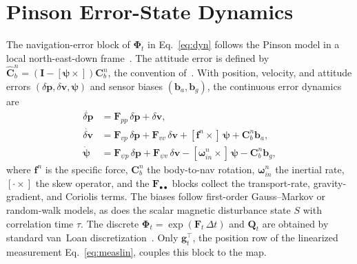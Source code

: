 \documentclass{IEEEtaes}
\begin{document}
\section{Pinson Error-State Dynamics}\label{app:pinson}
The navigation-error block of $\boldsymbol{\Phi}_t$ in Eq.~\eqref{eq:dyn} follows the
Pinson model in a local north-east-down frame~\cite{titterton2004,groves2013}. The
attitude error is defined by
$\hat{\mathbf{C}}^n_b=(\mathbf{I}-[\boldsymbol{\psi}\times])\mathbf{C}^n_b$,
the convention of~\cite{groves2013}. With
position, velocity, and attitude errors $(\delta\mathbf{p},\delta\mathbf{v},
\boldsymbol{\psi})$ and sensor biases $(\mathbf{b}_a,\mathbf{b}_g)$, the continuous
error dynamics are
\begin{equation}
\begin{aligned}
\dot{\delta\mathbf{p}}&=\mathbf{F}_{pp}\,\delta\mathbf{p}+\delta\mathbf{v},\\
\dot{\delta\mathbf{v}}&=\mathbf{F}_{vp}\,\delta\mathbf{p}
+\mathbf{F}_{vv}\,\delta\mathbf{v}
+[\mathbf{f}^n\times]\,\boldsymbol{\psi}+\mathbf{C}^n_b\mathbf{b}_a,\\
\dot{\boldsymbol{\psi}}&=\mathbf{F}_{\psi p}\,\delta\mathbf{p}
+\mathbf{F}_{\psi v}\,\delta\mathbf{v}
-[\boldsymbol{\omega}^n_{in}\times]\,\boldsymbol{\psi}-\mathbf{C}^n_b\mathbf{b}_g,
\end{aligned}
\label{eq:pinson}
\end{equation}
where $\mathbf{f}^n$ is the specific force, $\mathbf{C}^n_b$ the body-to-nav rotation,
$\boldsymbol{\omega}^n_{in}$ the inertial rate, $[\cdot\times]$ the skew operator, and
the $\mathbf{F}_{\bullet\bullet}$ blocks collect the transport-rate, gravity-gradient,
and Coriolis terms. The biases follow first-order Gauss--Markov or random-walk models,
as does the scalar magnetic disturbance state $S$ with correlation time $\tau$. The
discrete $\boldsymbol{\Phi}_t=\exp(\mathbf{F}_t\,\Delta t)$ and $\mathbf{Q}_t$ are
obtained by standard van~Loan discretization~\cite{farrell2008}. Only
$\mathbf{g}_t^{\top}$, the position row of the linearized
measurement Eq.~\eqref{eq:measlin}, couples this block to the map.
\end{document}
